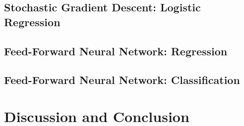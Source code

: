 \documentclass[]{article}
\begin{document}
\subsection{Stochastic Gradient Descent: Logistic Regression}


\subsection{Feed-Forward Neural Network: Regression}


\subsection{Feed-Forward Neural Network: Classification}



\clearpage
\section{Discussion and Conclusion} \label{conclusion}

\clearpage


\end{document}
